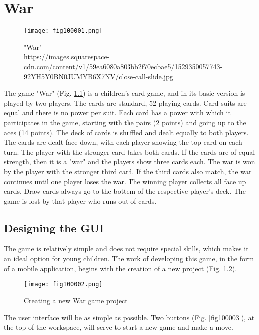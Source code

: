 ﻿\chapter{War}

\begin{figure}[H]
   \centering
   \texttt{[image: fig100001.png]}
   \caption{"War" \\ https://images.squarespace-cdn.com/content/v1/59ea6080a803bb2f70ecbae5/1529350057743-92YH5Y0BN0JUMYB6X7NV/close-call-slide.jpg}
\label{fig100001}
\end{figure}

The game "War" (Fig. \ref{fig100001}) is a children's card game, and in its basic version is played by two players. The cards are standard, 52 playing cards. Card suits are equal and there is no power per suit. Each card has a power with which it participates in the game, starting with the pairs (2 points) and going up to the aces (14 points). The deck of cards is shuffled and dealt equally to both players. The cards are dealt face down, with each player showing the top card on each turn. The player with the stronger card takes both cards. If the cards are of equal strength, then it is a "war" and the players show three cards each. The war is won by the player with the stronger third card. If the third cards also match, the war continues until one player loses the war. The winning player collects all face up cards. Draw cards always go to the bottom of the respective player's deck. The game is lost by that player who runs out of cards.

\section{Designing the GUI}

The game is relatively simple and does not require special skills, which makes it an ideal option for young children. The work of developing this game, in the form of a mobile application, begins with the creation of a new project (Fig. \ref{fig100002}).

\begin{figure}[H]
   \centering
   \texttt{[image: fig100002.png]}
   \caption{Creating a new War game project}
\label{fig100002}
\end{figure}

The user interface will be as simple as possible. Two buttons (Fig. \ref{fig100003}), at the top of the workspace, will serve to start a new game and make a move.

